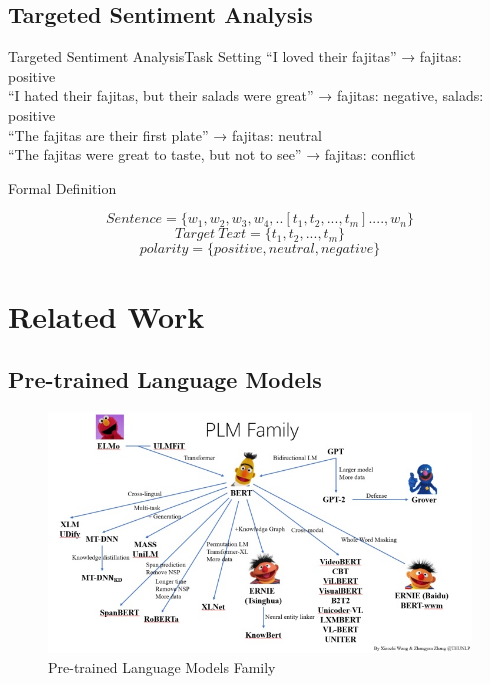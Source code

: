 \documentclass[xcolor=dvipsnames]{beamer}
\begin{document}
\subsection{Targeted Sentiment Analysis}

\begin{frame}{Targeted Sentiment Analysis}{Task Setting}
  \small
  “I loved their fajitas” → {fajitas: positive}\\
  “I hated their fajitas, but their salads were great” → {fajitas: negative, salads: positive}\\
  “The fajitas are their first plate” → {fajitas: neutral}\\
  “The fajitas were great to taste, but not to see” → {fajitas: conflict}\\
\end{frame}



\begin{frame}{Formal Definition}



\begin{equation}
Sentence=\{w_1,w_2,w_3,w_4,..[t_1,t_2,...,t_m]....,w_n\}
\end{equation}
\begin{equation}
Target \  Text=  \{t_1,t_2,...,t_m\}
\end{equation}
\begin{equation}
polarity=\{positive,neutral,negative\}
\end{equation}

\end{frame}



\section{Related Work}
\subsection{Pre-trained Language Models}

\begin{frame}
\begin{figure}[tp]
  \centering
  \includegraphics[width=0.7\linewidth]{./image/PLM.jpg}
  \caption{Pre-trained Language Models Family}
\label{example}
\end{figure}

\end{frame}
\end{document}
